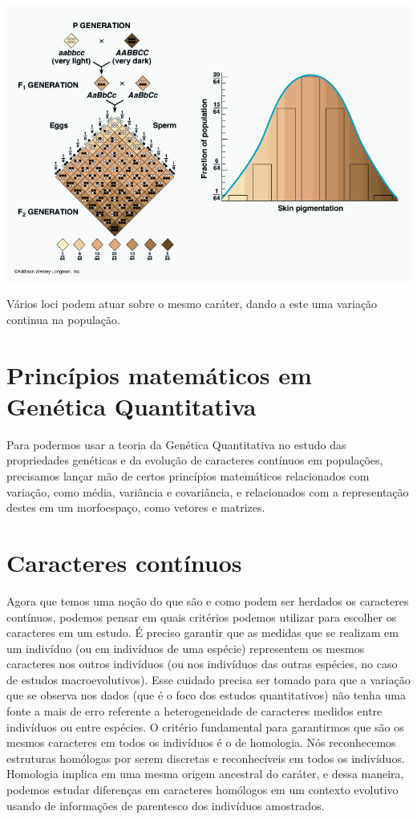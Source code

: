 \documentclass[portuges,]{tufte-handout}
\begin{document}
\begin{marginfigure}
\includegraphics{./figuras/variosalelos.png}
\caption{Vários loci podem atuar sobre o mesmo caráter, dando a
este uma variação continua na população.}
\label{variosloci}
\end{marginfigure}

\section{Princípios matemáticos em Genética
Quantitativa}\label{princuxedpios-matemuxe1ticos-em-genuxe9tica-quantitativa}

Para podermos usar a teoria da Genética Quantitativa no estudo das
propriedades genéticas e da evolução de caracteres contínuos em
populações, precisamos lançar mão de certos princípios matemáticos
relacionados com variação, como média, variância e covariância, e
relacionados com a representação destes em um morfoespaço, como vetores
e matrizes.

\section{Caracteres contínuos}\label{caracteres-contuxednuos}

Agora que temos uma noção do que são e como podem ser herdados os
caracteres contínuos, podemos pensar em quais critérios podemos utilizar
para escolher os caracteres em um estudo. É preciso garantir que as
medidas que se realizam em um indivíduo (ou em indivíduos de uma
espécie) representem os mesmos caracteres nos outros indivíduos (ou nos
indivíduos das outras espécies, no caso de estudos macroevolutivos).
Esse cuidado precisa ser tomado para que a variação que se observa nos
dados (que é o foco dos estudos quantitativos) não tenha uma fonte a
mais de erro referente a heterogeneidade de caracteres medidos entre
indivíduos ou entre espécies. O critério fundamental para garantirmos
que são os mesmos caracteres em todos os indivíduos é o de homologia.
Nós reconhecemos estruturas homólogas por serem discretas e
reconhecíveis em todos os indivíduos. Homologia implica em uma mesma
origem ancestral do caráter, e dessa maneira, podemos estudar diferenças
em caracteres homólogos em um contexto evolutivo usando de informações
de parentesco dos indivíduos amostrados.
\end{document}
